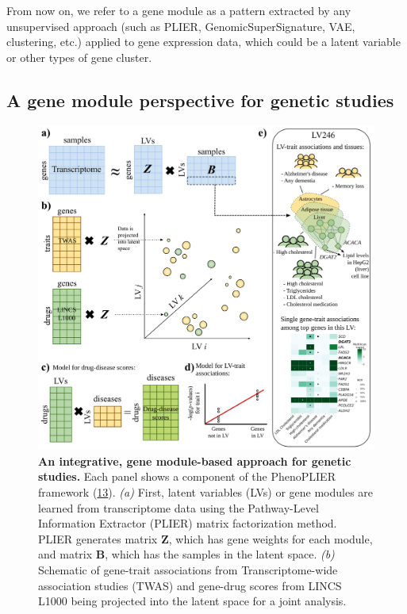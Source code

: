 From now on, we refer to a gene module as a pattern extracted by any unsupervised approach (such as PLIER, GenomicSuperSignature, VAE, clustering, etc.) applied to gene expression data, which could be a latent variable or other types of gene cluster.

\hypertarget{a-gene-module-perspective-for-genetic-studies}{%
\subsection{A gene module perspective for genetic studies}\label{a-gene-module-perspective-for-genetic-studies}}

\begin{figure}
\hypertarget{fig:fig4}{%
\centering
\includegraphics[width=1\textwidth,height=\textheight]{images/fig4.svg}
\caption{\textbf{An integrative, gene module-based approach for genetic studies.}
Each panel shows a component of the PhenoPLIER framework (\protect\hyperlink{ref-NM3rHx1i}{13}).
\emph{(a)} First, latent variables (LVs) or gene modules are learned from transcriptome data using the Pathway-Level Information Extractor (PLIER) matrix factorization method.
PLIER generates matrix \(\mathbf{Z}\), which has gene weights for each module, and matrix \(\mathbf{B}\), which has the samples in the latent space.
\emph{(b)} Schematic of gene-trait associations from Transcriptome-wide association studies (TWAS) and gene-drug scores from LINCS L1000 being projected into the latent space for a joint analysis.
}}
\end{figure}
